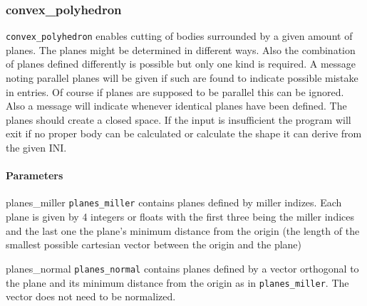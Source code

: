\subsubsection{convex_polyhedron}
\lstinline{convex_polyhedron} enables cutting of bodies surrounded by a given amount of planes. The planes might be determined in different ways. Also the combination of planes defined differently is possible but only one kind is required. A message noting parallel planes will be given if such are found to indicate possible mistake in entries. Of course if planes are supposed to be parallel this can be ignored. Also a message will indicate whenever identical planes have been defined. The planes should create a closed space. If the input is insufficient the program will exit if no proper body can be calculated or calculate the shape it can derive from the given INI.
\paragraph{Parameters}
\begin{description}
 \item{planes_miller} \lstinline{planes_miller} contains planes defined by miller indizes. Each plane is given by 4 integers or floats with the first three being the miller indices and the last one the plane's minimum distance from the origin (the length of the smallest possible cartesian vector between the origin and the plane)
 \item{planes_normal} \lstinline{planes_normal} contains planes defined by a vector orthogonal to the plane and its minimum distance from the origin as in \lstinline{planes_miller}. The vector does not need to be normalized.
\end{description} 


